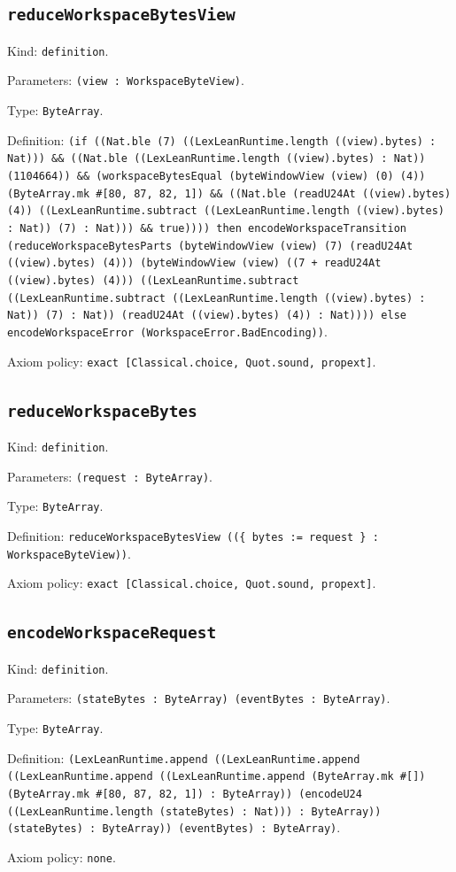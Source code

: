\documentclass[11pt]{article}
\begin{document}
\subsection*{\texttt{reduceWorkspaceBytesView}}
\noindent Kind: \texttt{definition}.\par
\noindent Parameters: \texttt{(view : WorkspaceByteView)}.\par
\noindent Type: \texttt{ByteArray}.\par
\noindent Definition: \texttt{(if ((Nat.ble (7) ((LexLeanRuntime.length ((view).bytes) : Nat))) \&\& ((Nat.ble ((LexLeanRuntime.length ((view).bytes) : Nat)) (1104664)) \&\& (workspaceBytesEqual (byteWindowView (view) (0) (4)) (ByteArray.mk \#[80, 87, 82, 1]) \&\& ((Nat.ble (readU24At ((view).bytes) (4)) ((LexLeanRuntime.subtract ((LexLeanRuntime.length ((view).bytes) : Nat)) (7) : Nat))) \&\& true)))) then encodeWorkspaceTransition (reduceWorkspaceBytesParts (byteWindowView (view) (7) (readU24At ((view).bytes) (4))) (byteWindowView (view) ((7 + readU24At ((view).bytes) (4))) ((LexLeanRuntime.subtract ((LexLeanRuntime.subtract ((LexLeanRuntime.length ((view).bytes) : Nat)) (7) : Nat)) (readU24At ((view).bytes) (4)) : Nat)))) else encodeWorkspaceError (WorkspaceError.BadEncoding))}.\par
\noindent Axiom policy: \texttt{exact [Classical.choice, Quot.sound, propext]}.\par
\subsection*{\texttt{reduceWorkspaceBytes}}
\noindent Kind: \texttt{definition}.\par
\noindent Parameters: \texttt{(request : ByteArray)}.\par
\noindent Type: \texttt{ByteArray}.\par
\noindent Definition: \texttt{reduceWorkspaceBytesView ((\{ bytes := request \} : WorkspaceByteView))}.\par
\noindent Axiom policy: \texttt{exact [Classical.choice, Quot.sound, propext]}.\par
\subsection*{\texttt{encodeWorkspaceRequest}}
\noindent Kind: \texttt{definition}.\par
\noindent Parameters: \texttt{(stateBytes : ByteArray) (eventBytes : ByteArray)}.\par
\noindent Type: \texttt{ByteArray}.\par
\noindent Definition: \texttt{(LexLeanRuntime.append ((LexLeanRuntime.append ((LexLeanRuntime.append ((LexLeanRuntime.append (ByteArray.mk \#[]) (ByteArray.mk \#[80, 87, 82, 1]) : ByteArray)) (encodeU24 ((LexLeanRuntime.length (stateBytes) : Nat))) : ByteArray)) (stateBytes) : ByteArray)) (eventBytes) : ByteArray)}.\par
\noindent Axiom policy: \texttt{none}.\par
\end{document}
